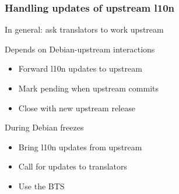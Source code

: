 \documentclass{beamer}
\begin{document}
\begin{frame}
  \frametitle{Handling updates of upstream l10n}
	\begin{block}
		{In general: ask translators to work upstream}
	\end{block}
	\begin{block}
		{Depends on Debian-upstream interactions}
		\begin{itemize}
		\item
			Forward l10n updates to upstream
		\item
			Mark pending when upstream commits
		\item
			Close with new upstream release
		\end{itemize}
	\end{block}
	\begin{block}
		{During Debian freezes}
		\begin{itemize}
		\item
			Bring l10n updates from upstream
		\item
			Call for updates to translators
		\item
			Use the BTS
		\end{itemize}
	\end{block}
\end{frame}

\end{document}
